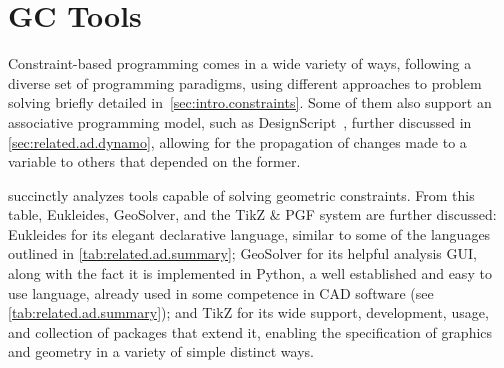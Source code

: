 \section{\acl{GC} Tools}%
\label{sec:related.constraints}

Constraint-based programming comes in a wide variety of ways, following a
diverse set of programming paradigms, using different approaches to problem
solving briefly detailed in~\cref{sec:intro.constraints}.  Some of them also
support an associative programming model, such as
DesignScript~\cite{Aish:2011:DesignScript}, further discussed in
\cref{sec:related.ad.dynamo}, allowing for the propagation of changes made to a
variable to others that depended on the former.

 succinctly analyzes tools capable of
solving geometric constraints.  From this table, Eukleides, GeoSolver, and the
\acs{TikZ} \& \acs{PGF} system are further discussed: Eukleides for its elegant
declarative language, similar to some of the languages outlined in
\cref{tab:related.ad.summary}; GeoSolver for its helpful analysis \ac{GUI},
along with the fact it is implemented in Python, a well established and easy to
use language, already used in some competence in \ac{CAD} software (see
\cref{tab:related.ad.summary}); and \acs{TikZ} for its wide support,
development, usage, and collection of packages that extend it, enabling the
specification of graphics and geometry in a variety of simple distinct ways.

